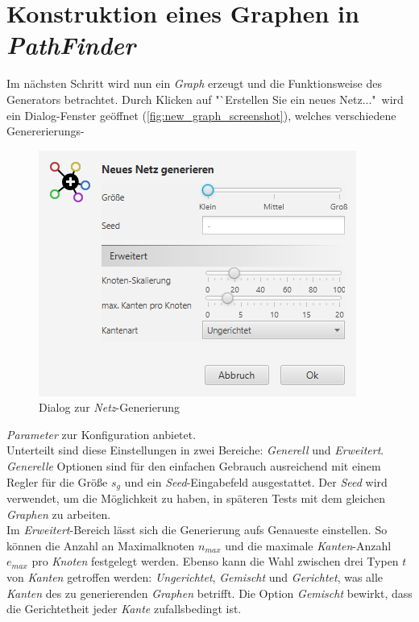 \documentclass[12pt]{article}
\begin{document}
\section{Konstruktion eines Graphen in \textit{PathFinder}}
\label{sec:construct}
Im nächsten Schritt wird nun ein \textit{Graph} erzeugt und die Funktionsweise des Generators betrachtet. Durch Klicken auf "`Erstellen Sie ein neues Netz..."\ wird ein Dialog-Fenster geöffnet (\autoref{fig:new_graph_screenshot}), welches verschiedene Genererierungs-
\begin{figure}
\vspace{-20pt}
\begin{center}
\includegraphics[scale=0.6]{res/new_graph_screenshot.png}
\end{center}
\vspace{-20pt}
\centering
\caption{Dialog zur \textit{Netz}-Generierung}
\label{fig:new_graph_screenshot}
\end{figure}
\textit{Parameter} zur Konfiguration anbietet.
\\
Unterteilt sind diese Einstellungen in zwei Bereiche: \textit{Generell} und \textit{Erweitert}. \textit{Generelle} Optionen sind für den einfachen Gebrauch ausreichend mit einem Regler für die Größe $s_g$ und ein \textit{Seed}-Eingabefeld ausgestattet. Der \textit{Seed} wird verwendet, um die Möglichkeit zu haben, in späteren Tests mit dem gleichen \textit{Graphen} zu arbeiten.
\\
Im \textit{Erweitert}-Bereich lässt sich die Generierung aufs Genaueste einstellen. So können die Anzahl an Maximalknoten $n_{max}$ und die maximale \textit{Kanten}-Anzahl $e_{max}$ pro \textit{Knoten} festgelegt werden. Ebenso kann die Wahl zwischen drei Typen $t$ von \textit{Kanten} getroffen werden: \textit{Ungerichtet}, \textit{Gemischt} und \textit{Gerichtet}, was alle \textit{Kanten} des zu generierenden \textit{Graphen} betrifft. Die Option \textit{Gemischt} bewirkt, dass die Gerichtetheit jeder \textit{Kante} zufallsbedingt ist.
\end{document}
